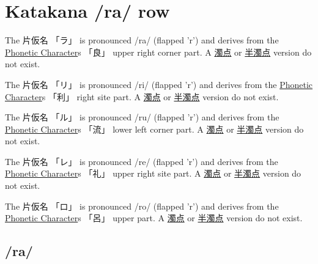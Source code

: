 \section{Katakana /ra/ row}\label{sec:KatakanaRaRow}


 The  片仮名 {「ラ」} is pronounced  /ra/ (flapped 'r')  and  derives from the
\hyperref[sec:PhoneticCharacter]{Phonetic Character}s {「良」} upper right corner part.
A \hyperref[sec:Dakuten]{濁点}  or \hyperref[sec:Handakuten]{半濁点} version  do not exist.


 The  片仮名 {「リ」} is pronounced  /ri/ (flapped 'r')  and  derives from the
\hyperref[sec:PhoneticCharacter]{Phonetic Character}s {「利」}  right site part.
A \hyperref[sec:Dakuten]{濁点}  or \hyperref[sec:Handakuten]{半濁点} version  do not exist.



 The  片仮名 {「ル」} is pronounced  /ru/ (flapped 'r')  and  derives from the
\hyperref[sec:PhoneticCharacter]{Phonetic Character}s {「流」} lower left corner part.
A \hyperref[sec:Dakuten]{濁点}  or \hyperref[sec:Handakuten]{半濁点} version  do not exist.


 The  片仮名 {「レ」} is pronounced  /re/ (flapped 'r')  and  derives from the
\hyperref[sec:PhoneticCharacter]{Phonetic Character}s {「礼」} upper right site part.
A \hyperref[sec:Dakuten]{濁点}  or \hyperref[sec:Handakuten]{半濁点} version  do not exist.

 The  片仮名 {「ロ」} is pronounced  /ro/ (flapped 'r')  and  derives from the
\hyperref[sec:PhoneticCharacter]{Phonetic Character}s {「呂」} upper part.
A \hyperref[sec:Dakuten]{濁点}  or \hyperref[sec:Handakuten]{半濁点} version  do not exist.



\newpage

\subsection{/ra/} \label{sec:KatakanaRa}

